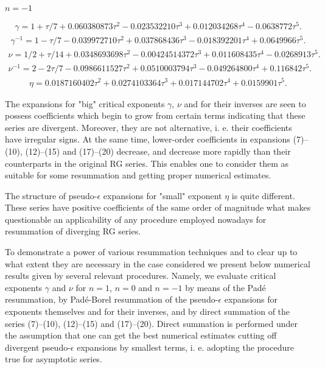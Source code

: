 \documentclass[preprint,preprintnumbers,amsmath,amssymb]{revtex4}
\begin{document}
\begin{center}
\textbf{$n = -1$}
\end{center}
\begin{eqnarray}
\gamma = 1 + \tau/7 + 0.060380873 \tau^{2}-0.023532210 \tau^{3}
+ 0.012034268 \tau^{4}-0.0638772 \tau^{5}.
\end{eqnarray}
\begin{eqnarray}
\gamma^{-1} = 1- \tau/7 - 0.039972710 \tau^2+0.037868436 \tau^3
- 0.018392201 \tau^{4}+ 0.0649966 \tau^{5}.
\end{eqnarray}
\begin{eqnarray}
\nu = 1/2 + \tau/14 + 0.0348693698 \tau^{2}
- 0.00424514372 \tau^{3} + 0.011608435 \tau^{4} - 0.0268913 \tau^{5}.
\end{eqnarray}
\begin{eqnarray}
\nu^{-1} = 2 - 2\tau/7 - 0.0986611527 \tau^{2}
+ 0.0510003794 \tau^{3} - 0.049264800 \tau^{4} + 0.116842 \tau^{5}.
\end{eqnarray}
\begin{eqnarray}
\eta = 0.0187160402 {\tau}^{2} + 0.0274103364 {\tau}^{3}
+ 0.017144702 {\tau}^{4} + 0.0159901 {\tau}^{5}.
\end{eqnarray}

The expansions for "big" critical exponents $\gamma$, $\nu$ and for their
inverses are seen to possess coefficients which begin to grow from certain
terms indicating that these series are divergent. Moreover, they are not
alternative, i. e. their coefficients have irregular signs. At the same time,
lower-order coefficients in expansions (7)--(10), (12)--(15) and (17)--(20)
decrease, and decrease more rapidly than their counterparts in the original
RG series. This enables one to consider them as suitable for some resummation
and getting proper numerical estimates.

The structure of pseudo-$\epsilon$ expansions for "small" exponent $\eta$ is
quite different. These series have positive coefficients of the same order of
magnitude what makes questionable an applicability of any procedure employed
nowadays for resummation of diverging RG series.

To demonstrate a power of various resummation techniques and to clear up to
what extent they are necessary in the case considered we present below numerical
results given by several relevant procedures. Namely, we evaluate critical
exponents $\gamma$ and $\nu$ for $n=1$, $n=0$ and $n =-1$ by means of the Pad\'e
resummation, by Pad\'e-Borel resummation of the pseudo-$\epsilon$ expansions for
exponents themselves and for their inverses, and by direct summation of the series
(7)--(10), (12)--(15) and (17)--(20). Direct summation is performed under the
assumption that one can get the best numerical estimates cutting off divergent
pseudo-$\epsilon$ expansions by smallest terms, i. e. adopting the procedure
true for asymptotic series.
\end{document}
